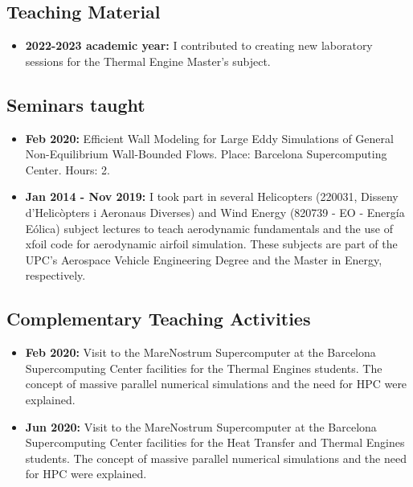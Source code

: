 \documentclass{article}
\begin{document}
\subsection{Teaching Material}
\begin{itemize}
\item {\bf 2022-2023 academic year:} I contributed to creating new laboratory sessions for the Thermal Engine Master's subject. 
\end{itemize}

\subsection{Seminars taught}

\begin{itemize}
\item {\bf Feb 2020:} Efficient Wall Modeling for Large Eddy Simulations of General Non-Equilibrium Wall-Bounded Flows. Place: Barcelona Supercomputing Center. Hours: 2.
\end{itemize}

\begin{itemize}
\item {\bf Jan 2014 - Nov 2019:} I took part in several Helicopters (220031,	
Disseny d'Helicòpters i Aeronaus Diverses) and  Wind Energy (820739 - EO - Energía Eólica) subject lectures to teach aerodynamic fundamentals and the use of xfoil code for aerodynamic airfoil simulation.  These subjects are part of the UPC's Aerospace Vehicle Engineering Degree and the Master in Energy, respectively.
\end{itemize}

\subsection{Complementary Teaching Activities}

\begin{itemize}
\item {\bf Feb 2020:} Visit to the MareNostrum Supercomputer at the Barcelona Supercomputing Center facilities for the Thermal Engines students. The concept of massive parallel numerical simulations and the need for HPC were explained.
\item {\bf Jun 2020:} Visit to the MareNostrum Supercomputer at the Barcelona Supercomputing Center facilities for the Heat Transfer and Thermal Engines students. The concept of massive parallel numerical simulations and the need for HPC were explained. 
\end{itemize}
\end{document}
